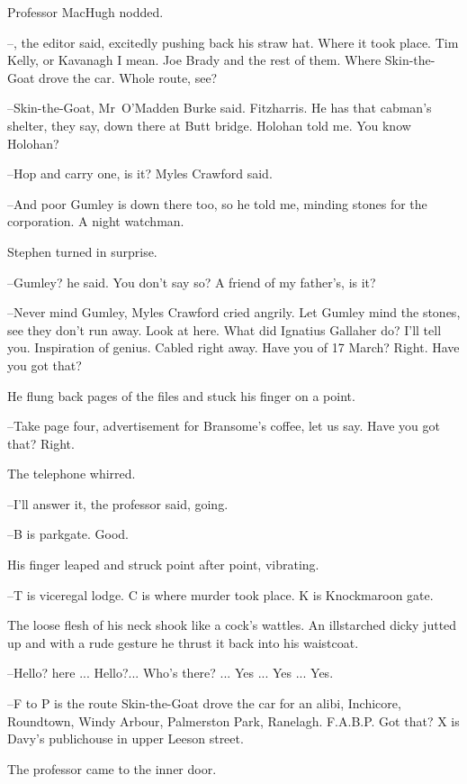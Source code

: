 Professor MacHugh nodded.

--,
the editor said,
excitedly pushing back his straw hat.
Where it took place.
Tim Kelly, or Kavanagh I mean.
Joe Brady and the rest of them.
Where Skin-the-Goat drove the car.
Whole route, see?

--Skin-the-Goat,
Mr~O'Madden Burke said.
Fitzharris.
He has that cabman's shelter, they say,
down there at Butt bridge.
Holohan told me.
You know Holohan?

--Hop and carry one,
is it?
Myles Crawford said.

--And poor Gumley is down there too,
so he told me,
minding stones for the corporation.
A night watchman.

Stephen turned in surprise.

--Gumley?
he said.
You don't say so?
A friend of my father's,
is it?

--Never mind Gumley,
Myles Crawford cried angrily.
Let Gumley mind the stones,
see they don't run away.
Look at here.
What did Ignatius Gallaher do?
I'll tell you.
Inspiration of genius.
Cabled right away.
Have you  of 17 March?
Right.
Have you got that?

He flung back pages of the files
and stuck his finger on a point.

--Take page four,
advertisement for Bransome's coffee,
let us say.
Have you got that?
Right.

The telephone whirred.



--I'll answer it,
the professor said,
going.

--B is parkgate.
Good.

His finger leaped and struck point after point,
vibrating.

--T is viceregal lodge.
C is where murder took place.
K is Knockmaroon gate.

The loose flesh of his neck shook like a cock's wattles.
An illstarched dicky jutted up
and with a rude gesture
he thrust it back into his waistcoat.

--Hello?
 here ...
Hello?...
Who's there? ...
Yes ...
Yes ...
Yes.

--F to P is the route Skin-the-Goat drove the car for an alibi,
Inchicore, Roundtown, Windy Arbour, Palmerston Park, Ranelagh.
F.A.B.P.
Got that?
X is Davy's publichouse in upper Leeson street.

The professor came to the inner door.

